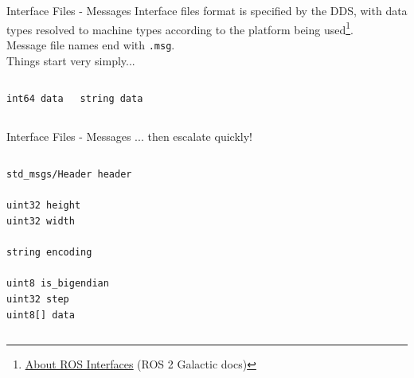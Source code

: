 \begin{frame}[fragile]{Interface Files - Messages}
Interface files format is specified by the DDS, with data types resolved to machine types according to the platform being used\footnote{\href{https://docs.ros.org/en/galactic/Concepts/About-ROS-Interfaces.html}{\color{blue}\underline{About ROS Interfaces}} (ROS 2 Galactic docs)}.\\
Message file names end with \texttt{.msg}.\\
Things start very simply...

\begin{columns}
\begin{lstlisting}[language=ros2msg, caption=Definition of the \texttt{std\_msgs/msg/Int64} message]
int64 data
\end{lstlisting}

\begin{lstlisting}[language=ros2msg, caption=Definition of the \texttt{std\_msgs/msg/String} message]
string data
\end{lstlisting}
\end{columns}

\end{frame}
\begin{frame}[fragile]{Interface Files - Messages}
... then escalate quickly!

\begin{columns}
\begin{lstlisting}[language=ros2msg, caption=Definition of the \texttt{sensor\_msgs/msg/Image} composite message]
std_msgs/Header header

uint32 height
uint32 width

string encoding

uint8 is_bigendian
uint32 step
uint8[] data
\end{lstlisting}
\end{columns}

\end{frame}
